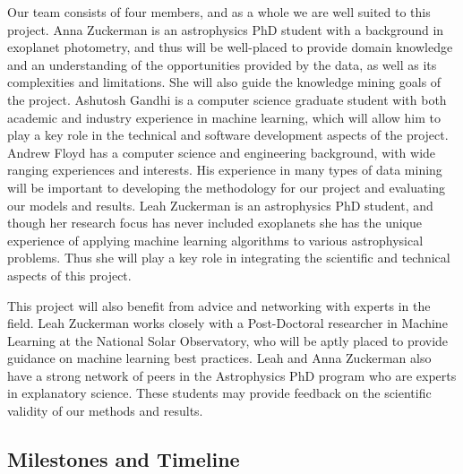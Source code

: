 \documentclass{article}
\begin{document}
Our team consists of four members, and as a whole we are well suited to this project. Anna Zuckerman is an astrophysics PhD student with a background in exoplanet photometry, and thus will be well-placed to provide domain knowledge and an understanding of the opportunities provided by the data, as well as its complexities and limitations. She will also guide the knowledge mining goals of the project. Ashutosh Gandhi is a computer science graduate student with both academic and industry experience in machine learning, which will allow him to play a key role in the technical and software development aspects of the project. Andrew Floyd has a computer science and engineering background, with wide ranging experiences and interests. His experience in many types of data mining will be important to developing the methodology for our project and evaluating our models and results. Leah Zuckerman is an astrophysics PhD student, and though her research focus has never included exoplanets she has the unique experience of applying machine learning algorithms to various astrophysical problems. Thus she will play a key role in integrating the scientific and technical aspects of this project.

This project will also benefit from advice and networking with experts in the field. Leah Zuckerman works closely with a Post-Doctoral researcher in Machine Learning at the National Solar Observatory, who will be aptly placed to provide guidance on machine learning best practices. Leah and Anna Zuckerman also have a strong network of peers in the Astrophysics PhD program who are experts in explanatory science. These students may provide feedback on the scientific validity of our methods and results.  

\subsection{Milestones and Timeline}


\end{document}
